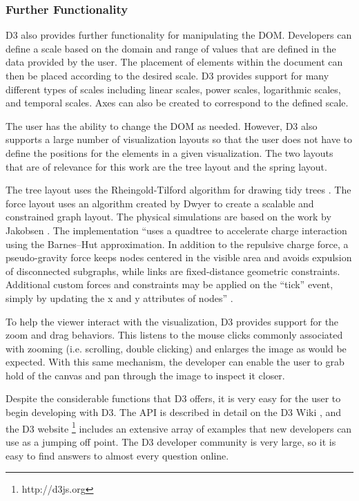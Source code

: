 \subsubsection{Further Functionality}

D3 also provides further functionality for manipulating the DOM. Developers can define a scale based on the domain and range of values that are defined in the data provided by the user. The placement of elements within the document can then be placed according to the desired scale. D3 provides support for many different types of scales including linear scales, power scales, logarithmic scales, and temporal scales. Axes can also be created to correspond to the defined scale.

The user has the ability to change the DOM as needed. However, D3 also supports a large number of visualization layouts so that the user does not have to define the positions for the elements in a given visualization. The two layouts that are of relevance for this work are the tree layout and the spring layout.

The tree layout uses the Rheingold-Tilford algorithm for drawing tidy trees \cite{Reingold81}. The force layout uses an algorithm created by Dwyer \cite{Dwyer2009} to create a scalable and constrained graph layout. The physical simulations are based on the work by Jakobsen \cite{Jakobsen03}. The implementation ``uses a quadtree to accelerate charge interaction using the Barnes–Hut approximation. In addition to the repulsive charge force, a pseudo-gravity force keeps nodes centered in the visible area and avoids expulsion of disconnected subgraphs, while links are fixed-distance geometric constraints. Additional custom forces and constraints may be applied on the ``tick'' event, simply by updating the x and y attributes of nodes'' \cite{D3Wiki}.

To help the viewer interact with the visualization, D3 provides support for the zoom and drag behaviors. This listens to the mouse clicks commonly associated with zooming (i.e. scrolling, double clicking) and enlarges the image as would be expected. With this same mechanism, the developer can enable the user to grab hold of the canvas and pan through the image to inspect it closer.

Despite the considerable functions that D3 offers, it is very easy for the user to begin developing with D3. The API is described in detail on the D3 Wiki \cite{D3Wiki}, and the D3 website \footnote{http://d3js.org} includes an extensive array of examples that new developers can use as a jumping off point. The D3 developer community is very large, so it is easy to find answers to almost every question online. 

